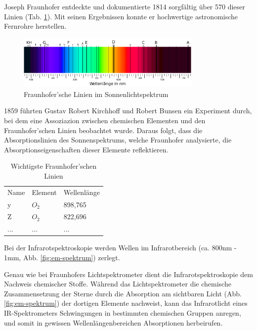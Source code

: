 \documentclass{article}
\begin{document}

Joseph Fraunhofer entdeckte und dokumentierte 1814 sorgfältig über 570 dieser Linien (Tab. \ref{tab:wichtige-fraunhoferlinien}). Mit seinen Ergebnissen konnte er hochwertige astronomische Fernrohre herstellen.

\begin{figure}[H]
    \centering
    \includegraphics[width=0.8\textwidth]{fraunhofer_linien.png}
    \caption{Fraunhofer'sche Linien im Sonnenlichtspektrum}
    \label{fig:fraunhofer-linien}
\end{figure}

1859 führten Gustav Robert Kirchhoff und Robert Bunsen ein Experiment durch, bei dem eine Assoziazion zwischen chemischen Elementen und den Fraunhofer'schen Linien beobachtet wurde. Daraus folgt, dass die Absorptionslinien des Sonnenspektrums, welche Fraunhofer analysierte, die Absorptionseigenschaften dieser Elemente reflektieren.

\begin{table}[H]
    \centering
    \label{tab:wichtige-fraunhoferlinien}
    \begin{tabular}{l|l|l}
        Name & Element & Wellenlänge \\
        y    & $O_2$    & 898,765    \\
        Z    & $O_2$    & 822,696    \\
        ...  & ...      & ... %
    \end{tabular}
    \caption{Wichtigste Fraunhofer'schen Linien}
\end{table}


Bei der Infrarotspektroskopie werden Wellen im Infrarotbereich (ca. 800nm - 1mm, Abb. \ref{fig:em-spektrum}) zerlegt.

Genau wie bei Fraunhofers Lichtspektrometer dient die Infrarotspektroskopie dem Nachweis chemischer Stoffe. Während das Lichtspektrometer die chemische Zusammensetzung der Sterne durch die Absorption am sichtbaren Licht (Abb. \ref{fig:em-spektrum}) der dortigen Elemente nachweist, kann das Infrarotlicht eines IR-Spektrometers Schwingungen in bestimmten chemischen Gruppen anregen, und somit in gewissen Wellenlängenbereichen Absorptionen herbeirufen. 
\end{document}

